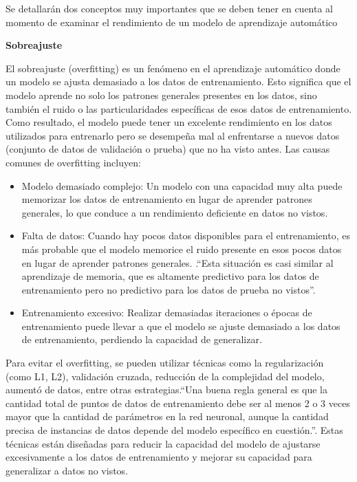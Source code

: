 Se detallarán dos conceptos muy importantes que se deben tener en cuenta al momento de examinar el rendimiento de un modelo de aprendizaje automático

\textbf{Sobreajuste}

El sobreajuste (overfitting) es un fenómeno en el aprendizaje automático donde un modelo se ajusta demasiado a los datos de entrenamiento. Esto significa que el modelo aprende no solo los patrones generales presentes en los datos, sino también el ruido o las particularidades específicas de esos datos de entrenamiento. Como resultado, el modelo puede tener un excelente rendimiento en los datos utilizados para entrenarlo pero se desempeña mal al enfrentarse a nuevos datos (conjunto de datos de validación o prueba) que no ha visto antes. Las causas comunes de overfitting incluyen:

\begin{itemize}

	\item Modelo demasiado complejo: Un modelo con una capacidad muy alta puede memorizar los datos de entrenamiento en lugar de aprender patrones generales, lo que conduce a un rendimiento deficiente en datos no vistos.
	
	\item Falta de datos: Cuando hay pocos datos disponibles para el entrenamiento, es más probable que el modelo memorice el ruido presente en esos pocos datos en lugar de aprender patrones generales. .``Esta situación es casi similar al aprendizaje de memoria, que es altamente predictivo para los datos de entrenamiento pero no predictivo para los datos de prueba no vistos''\cite[p. 25]{aggarwal2018neural}.
	
	\item Entrenamiento excesivo: Realizar demasiadas iteraciones o épocas de entrenamiento puede llevar a que el modelo se ajuste demasiado a los datos de entrenamiento, perdiendo la capacidad de generalizar.

\end{itemize}

Para evitar el overfitting, se pueden utilizar técnicas como la regularización (como L1, L2), validación cruzada, reducción de la complejidad del modelo, aumentó de datos, entre otras estrategias.``Una buena regla general es que la cantidad total de puntos de datos de entrenamiento debe ser al menos 2 o 3 veces mayor que la cantidad de parámetros en la red neuronal, aunque la cantidad precisa de instancias de datos depende del modelo específico en cuestión.''\cite[p. 25]{aggarwal2018neural}. Estas técnicas están diseñadas para reducir la capacidad del modelo de ajustarse excesivamente a los datos de entrenamiento y mejorar su capacidad para generalizar a datos no vistos.

